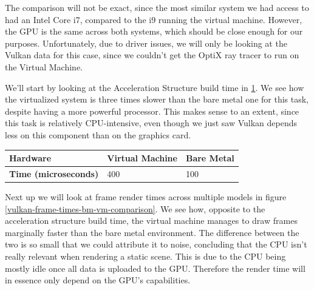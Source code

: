 The comparison will not be exact, since the most similar system we had access to had an Intel Core i7, compared to the i9 running the virtual machine. However, the GPU is the same across both systems, which should be close enough for our purposes. Unfortunately, due to driver issues, we will only be looking at the Vulkan data for this case, since we couldn't get the OptiX ray tracer to run on the Virtual Machine.

We'll start by looking at the Acceleration Structure build time in \ref{vulkan-accelbuildtime-bm-vm-comparison}. We see how the virtualized system is three times slower than the bare metal one for this task, despite having a more powerful processor. This makes sense to an extent, since this task is relatively CPU-intensive, even though we just saw Vulkan depends less on this component than on the graphics card.

\begin{center}
  \begin{table}
    \begin{tabular}{ | m{5cm}| m{3cm} | m{3cm} |}
  \hline
  \textbf{Hardware}& Virtual Machine& Bare Metal\\
  \hline
  \textbf{Time (microseconds)}& 400& 100 \\
  \hline
\end{tabular}
  \label{vulkan-accelbuildtime-bm-vm-comparison}
\end{table}
\end{center}

Next up we will look at frame render times across multiple models in figure \ref{vulkan-frame-times-bm-vm-comparison}. We see how, opposite to the acceleration structure build time, the virtual machine manages to draw frames marginally faster than the bare metal environment. The difference between the two is so small that we could attribute it to noise, concluding that the CPU isn't really relevant when rendering a static scene. This is due to the CPU being mostly idle once all data is uploaded to the GPU. Therefore the render time will in essence only depend on the GPU's capabilities.

